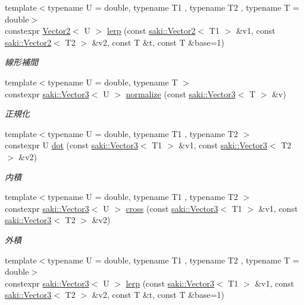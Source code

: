 \begin{DoxyCompactItemize}
{\footnotesize template$<$typename U  = double, typename T1 , typename T2 , typename T  = double$>$ }\\constexpr \mbox{\hyperlink{classsaki_1_1_vector2}{Vector2}}$<$ U $>$ \mbox{\hyperlink{namespacesaki_a5e45e40b08ddcb3cde0da9131078a9f7}{lerp}} (const \mbox{\hyperlink{classsaki_1_1_vector2}{saki\+::\+Vector2}}$<$ T1 $>$ \&v1, const \mbox{\hyperlink{classsaki_1_1_vector2}{saki\+::\+Vector2}}$<$ T2 $>$ \&v2, const T \&t, const T \&base=1)
\begin{DoxyCompactList}\small\item\em 線形補間 \end{DoxyCompactList}\item 
{\footnotesize template$<$typename U  = double, typename T $>$ }\\constexpr \mbox{\hyperlink{classsaki_1_1_vector3}{saki\+::\+Vector3}}$<$ U $>$ \mbox{\hyperlink{namespacesaki_a9d2c1a56c676217c90344612186cf3bb}{normalize}} (const \mbox{\hyperlink{classsaki_1_1_vector3}{saki\+::\+Vector3}}$<$ T $>$ \&v)
\begin{DoxyCompactList}\small\item\em 正規化 \end{DoxyCompactList}\item 
{\footnotesize template$<$typename U  = double, typename T1 , typename T2 $>$ }\\constexpr U \mbox{\hyperlink{namespacesaki_a6c6b476a4701cfe673da8e930895c297}{dot}} (const \mbox{\hyperlink{classsaki_1_1_vector3}{saki\+::\+Vector3}}$<$ T1 $>$ \&v1, const \mbox{\hyperlink{classsaki_1_1_vector3}{saki\+::\+Vector3}}$<$ T2 $>$ \&v2)
\begin{DoxyCompactList}\small\item\em 内積 \end{DoxyCompactList}\item 
{\footnotesize template$<$typename U  = double, typename T1 , typename T2 $>$ }\\constexpr \mbox{\hyperlink{classsaki_1_1_vector3}{saki\+::\+Vector3}}$<$ U $>$ \mbox{\hyperlink{namespacesaki_a5abe501bb1b1b0f15b56409f59a6b319}{cross}} (const \mbox{\hyperlink{classsaki_1_1_vector3}{saki\+::\+Vector3}}$<$ T1 $>$ \&v1, const \mbox{\hyperlink{classsaki_1_1_vector3}{saki\+::\+Vector3}}$<$ T2 $>$ \&v2)
\begin{DoxyCompactList}\small\item\em 外積 \end{DoxyCompactList}\item 
{\footnotesize template$<$typename U  = double, typename T1 , typename T2 , typename T  = double$>$ }\\constexpr \mbox{\hyperlink{classsaki_1_1_vector3}{saki\+::\+Vector3}}$<$ U $>$ \mbox{\hyperlink{namespacesaki_a869e38d6d36699cc305e7bd15d6d3123}{lerp}} (const \mbox{\hyperlink{classsaki_1_1_vector3}{saki\+::\+Vector3}}$<$ T1 $>$ \&v1, const \mbox{\hyperlink{classsaki_1_1_vector3}{saki\+::\+Vector3}}$<$ T2 $>$ \&v2, const T \&t, const T \&base=1)

\end{DoxyCompactItemize}
